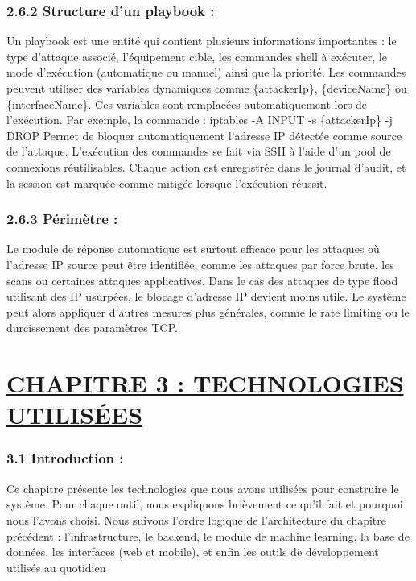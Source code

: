 \documentclass[12pt,a4paper]{report}
\newcommand{\ub}[1]{\uline{\textbf{#1}}}
\begin{document}
\subsection*{2.6.2 Structure d’un playbook :}
Un playbook est une entité qui contient plusieurs informations importantes : le type d’attaque associé, l’équipement cible, les commandes shell à exécuter, le mode d’exécution (automatique ou manuel) ainsi que la priorité. Les commandes peuvent utiliser des variables dynamiques comme \{attackerIp\}, \{deviceName\} ou \{interfaceName\}. Ces variables sont remplacées automatiquement lors de l’exécution. Par exemple, la commande : iptables -A INPUT -s \{attackerIp\} -j DROP Permet de bloquer automatiquement l’adresse IP détectée comme source de l’attaque. L’exécution des commandes se fait via SSH à l’aide d’un pool de connexions réutilisables. Chaque action est enregistrée dans le journal d’audit, et la session est marquée comme mitigée lorsque l’exécution réussit.\par
\subsection*{2.6.3 Périmètre :}
Le module de réponse automatique est surtout efficace pour les attaques où l’adresse IP source peut être identifiée, comme les attaques par force brute, les scans ou certaines attaques applicatives. Dans le cas des attaques de type flood utilisant des IP usurpées, le blocage d’adresse IP devient moins utile. Le système peut alors appliquer d’autres mesures plus générales, comme le rate limiting ou le durcissement des paramètres TCP.\par
\clearpage
\chapter*{\ub{CHAPITRE 3 : TECHNOLOGIES UTILISÉES}}
\subsection*{3.1 Introduction :}
Ce chapitre présente les technologies que nous avons utilisées pour construire le système. Pour chaque outil, nous expliquons brièvement ce qu'il fait et pourquoi nous l'avons choisi. Nous suivons l'ordre logique de l'architecture du chapitre précédent : l'infrastructure, le backend, le module de machine learning, la base de données, les interfaces (web et mobile), et enfin les outils de développement utilisés au quotidien\par
\end{document}
